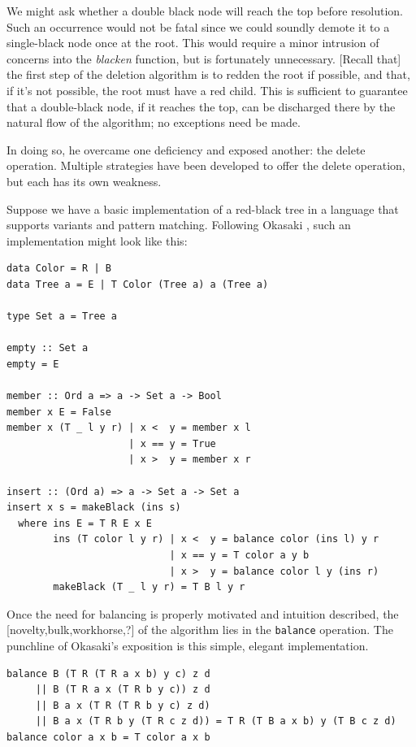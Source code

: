 \documentclass[preprint]{sigplanconf}
\begin{document}
We might ask whether a double black node will reach the top before resolution. Such an occurrence would not be fatal since we could soundly demote it to a single-black node once at the root. This would require a minor intrusion of concerns into the \emph{blacken} function, but is fortunately unnecessary. [Recall that] the first step of the deletion algorithm is to redden the root if possible, and that, if it's not possible, the root must have a red child. This is sufficient to guarantee that a double-black node, if it reaches the top, can be discharged there by the natural flow of the algorithm; no exceptions need be made.

In doing so, he overcame one deficiency and exposed another: the delete operation. Multiple strategies have been developed to offer the delete operation, but each has its own weakness.

Suppose we have a basic implementation of a red-black tree in a language that supports variants and pattern matching. Following Okasaki \cite{okasaki1999functional}, such an implementation might look like this:

\begin{verbatim}
data Color = R | B
data Tree a = E | T Color (Tree a) a (Tree a)

type Set a = Tree a

empty :: Set a
empty = E

member :: Ord a => a -> Set a -> Bool
member x E = False
member x (T _ l y r) | x <  y = member x l
                     | x == y = True
                     | x >  y = member x r 

insert :: (Ord a) => a -> Set a -> Set a
insert x s = makeBlack (ins s)
  where ins E = T R E x E
        ins (T color l y r) | x <  y = balance color (ins l) y r
                            | x == y = T color a y b
                            | x >  y = balance color l y (ins r)
        makeBlack (T _ l y r) = T B l y r
\end{verbatim}
Once the need for balancing is properly motivated and intuition described, the [novelty,bulk,workhorse,?] of the algorithm lies in the \texttt{balance} operation. The punchline of Okasaki's exposition is this simple, elegant implementation.
\begin{verbatim}
balance B (T R (T R a x b) y c) z d
     || B (T R a x (T R b y c)) z d
     || B a x (T R (T R b y c) z d)
     || B a x (T R b y (T R c z d)) = T R (T B a x b) y (T B c z d)
balance color a x b = T color a x b
\end{verbatim}
\end{document}
